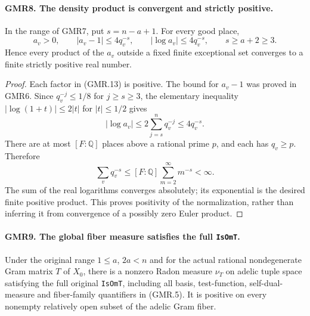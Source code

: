 \documentclass[11pt,a4paper]{article}
\numberwithin{equation}{section}
\theoremstyle{remark}\newtheorem{remark}[theorem]{Remark}
\begin{document}
\paragraph{GMR8. The density product is convergent and strictly positive.}
\label{claim:GMR8}
In the range of GMR7, put $s=n-a+1$.  For every good place,
\[
 a_v>0,\qquad |a_v-1|\leq4q_v^{-s},\qquad
 |\log a_v|\leq4q_v^{-s},\qquad s\geq a+2\geq3.
 \tag{GMR.14}
\]
Hence every product of the $a_v$ outside a fixed finite exceptional
set converges to a finite strictly positive real number.

\begin{proof}
Each factor in (GMR.13) is positive.  The bound for $a_v-1$ was proved
in GMR6.  Since $q_v^{-j}\leq1/8$ for $j\geq s\geq3$, the elementary
inequality $|\log(1+t)|\leq2|t|$ for $|t|\leq1/2$ gives
\[
 |\log a_v|\leq2\sum_{j=s}^nq_v^{-j}\leq4q_v^{-s}.
\]
There are at most $[F:\mathbb Q]$ places above a rational prime $p$,
and each has $q_v\geq p$.  Therefore
\[
 \sum_vq_v^{-s}\leq[F:\mathbb Q]\sum_{m=2}^{\infty}m^{-s}<\infty.
\]
The sum of the real logarithms converges absolutely; its exponential
is the desired finite positive product.  This proves positivity of
the normalization, rather than inferring it from convergence of a
possibly zero Euler product.
\end{proof}

\paragraph{GMR9. The global fiber measure satisfies the full \texttt{Is\allowbreak Om\allowbreak T}.}
\label{claim:GMR9}
Under the original range $1\leq a$, $2a<n$ and for the actual rational
nondegenerate Gram matrix $T$ of $X_0$, there is a nonzero Radon measure
$\nu_T$ on adelic tuple space satisfying the full original
\texttt{Is\allowbreak Om\allowbreak T}, including all basis, test-function, self-dual-measure
and fiber-family quantifiers in (GMR.5).  It is positive on every
nonempty relatively open subset of the adelic Gram fiber.
\end{document}
